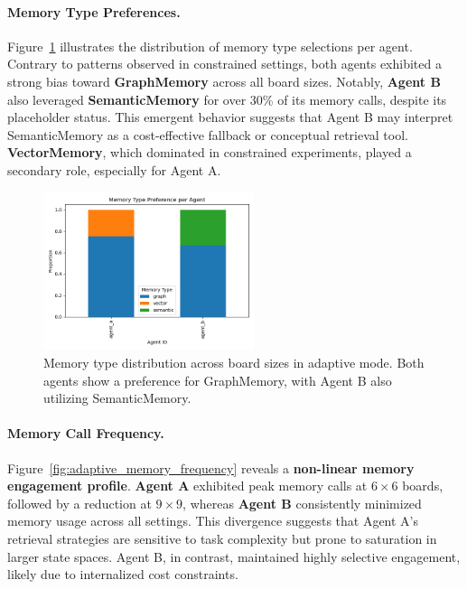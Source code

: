 \documentclass[10pt]{article}
\begin{document}
\paragraph{Memory Type Preferences.}
Figure~\ref{fig:adaptive_memory_type} illustrates the distribution of memory type selections per agent. Contrary to patterns observed in constrained settings, both agents exhibited a strong bias toward \textbf{GraphMemory} across all board sizes. Notably, \textbf{Agent B} also leveraged \textbf{SemanticMemory} for over 30\% of its memory calls, despite its placeholder status. This emergent behavior suggests that Agent B may interpret SemanticMemory as a cost-effective fallback or conceptual retrieval tool. \textbf{VectorMemory}, which dominated in constrained experiments, played a secondary role, especially for Agent A.

\begin{figure}[ht]
\centering
\includegraphics[width=0.55\textwidth]{figures/adaptive/memory_type_preference.png}
\caption{Memory type distribution across board sizes in adaptive mode. Both agents show a preference for GraphMemory, with Agent B also utilizing SemanticMemory.}
\label{fig:adaptive_memory_type}
\end{figure}

\paragraph{Memory Call Frequency.}
Figure~\ref{fig:adaptive_memory_frequency} reveals a \textbf{non-linear memory engagement profile}. \textbf{Agent A} exhibited peak memory calls at $6\times6$ boards, followed by a reduction at $9\times9$, whereas \textbf{Agent B} consistently minimized memory usage across all settings. This divergence suggests that Agent A's retrieval strategies are sensitive to task complexity but prone to saturation in larger state spaces. Agent B, in contrast, maintained highly selective engagement, likely due to internalized cost constraints.
\end{document}
